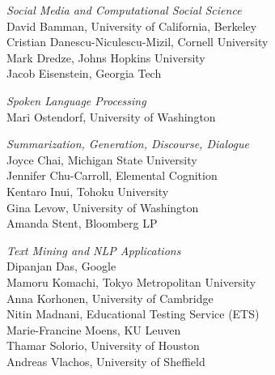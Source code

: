 \emph{Social Media and Computational Social Science} \\
\hspace*{0.2in} David Bamman, University of California, Berkeley \\
\hspace*{0.2in} Cristian Danescu-Niculescu-Mizil, Cornell University \\
\hspace*{0.2in} Mark Dredze, Johns Hopkins University \\
\hspace*{0.2in} Jacob Eisenstein, Georgia Tech


\emph{Spoken Language Processing} \\
\hspace*{0.2in} Mari Ostendorf, University of Washington


\emph{Summarization, Generation, Discourse, Dialogue} \\
\hspace*{0.2in} Joyce Chai,  Michigan State University   \\
\hspace*{0.2in} Jennifer Chu-Carroll,  Elemental Cognition  \\
\hspace*{0.2in} Kentaro Inui, Tohoku University  \\
\hspace*{0.2in} Gina Levow, University of Washington  \\
\hspace*{0.2in} Amanda Stent, Bloomberg LP 


\emph{
Text Mining and NLP Applications
} \\
\hspace*{0.2in} Dipanjan Das, Google \\
\hspace*{0.2in} Mamoru Komachi,  Tokyo Metropolitan University  \\
\hspace*{0.2in} Anna Korhonen, University of Cambridge  \\
\hspace*{0.2in} Nitin Madnani, Educational Testing Service (ETS)  \\
\hspace*{0.2in} Marie-Francine Moens, KU Leuven  \\
\hspace*{0.2in} Thamar Solorio, University of Houston  \\
\hspace*{0.2in} Andreas Vlachos, University of Sheffield 

